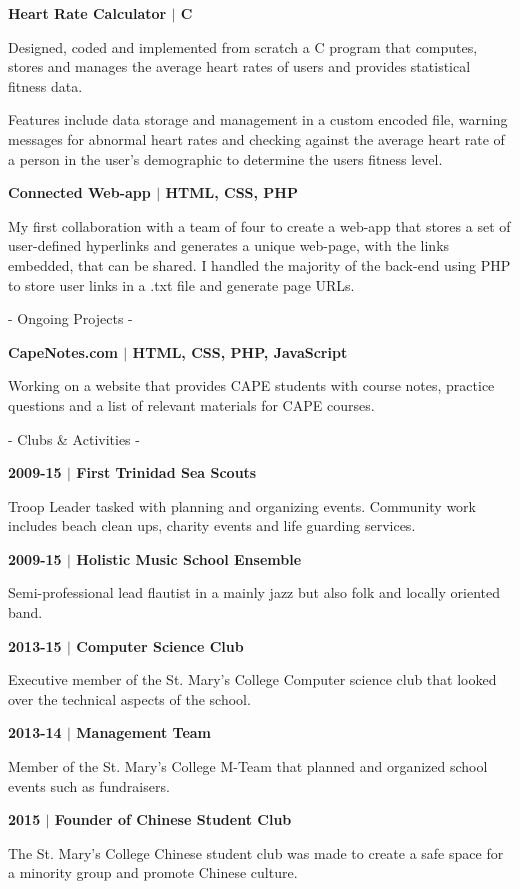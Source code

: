 \documentclass[twocolumn]{article}
\begin{document}
\begin{twocolumn}
{\sffamily\bf\small {\large Heart Rate Calculator $|$} C}\par
{\selectfont Designed, coded and implemented from scratch a C program that computes, stores and manages the average heart rates of users and provides statistical fitness data. \par 
Features include data storage and management in a custom encoded file, warning messages for abnormal heart rates and checking against the average heart rate of a person in the user's demographic to determine the users fitness level.}\par
\medskip

{\sffamily\bf\small {\large Connected Web-app $|$} HTML, CSS, PHP}\par
{\selectfont My first collaboration with a team of four to create a web-app that stores a set of user-defined hyperlinks and generates a unique web-page, with the links embedded, that can be shared. I handled the majority of the back-end using PHP to store user links in a .txt file and generate page URLs.}\par
\bigskip

{\Large\sc - Ongoing Projects -} \smallskip\par
{\sffamily\bf\small {\large CapeNotes.com $|$} HTML, CSS, PHP, JavaScript}\par
{\selectfont Working on a website that provides CAPE students with course notes, practice questions and a list of relevant materials for CAPE courses.}\par
\bigskip

{\Large\sc - Clubs \& Activities -} \smallskip\par
{\sffamily\bf 2009-15 $|$ {\large First Trinidad Sea Scouts}}\par
{\selectfont Troop Leader tasked with planning and organizing events. Community work includes beach clean ups, charity events and life guarding services.}\par
{\sffamily\bf 2009-15 $|$ {\large Holistic Music School Ensemble}}\par
{\selectfont Semi-professional lead flautist in a mainly
jazz but also folk and locally oriented band.}\par
{\sffamily\bf 2013-15 $|$ {\large Computer Science Club}}\par
{\selectfont Executive member of the St. Mary's College Computer science club that looked over the technical aspects of the school.}\par
{\sffamily\bf 2013-14 $|$ {\large Management Team}}\par
{\selectfont Member of the St. Mary's College M-Team that planned and organized school events such as fundraisers.}\par
{\sffamily\bf 2015 $|$ {\large Founder of Chinese Student Club}}\par
{\selectfont The St. Mary's College Chinese student club was made to create a safe space for a minority group and promote Chinese culture.}


\end{twocolumn}
\end{document}
